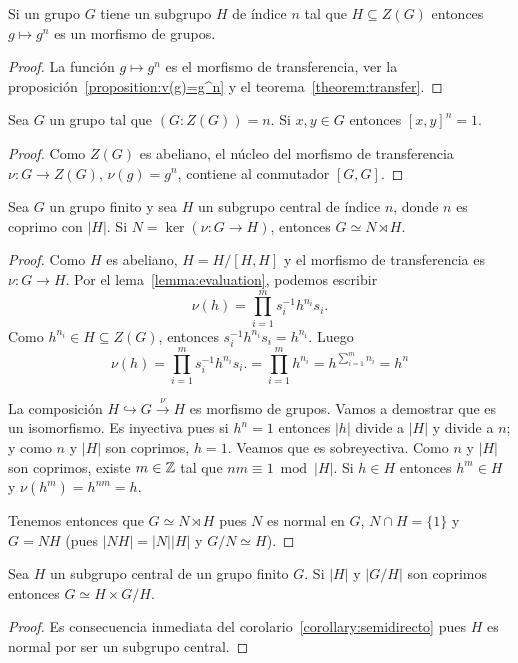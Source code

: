 \begin{corollary}
	Si un grupo $G$ tiene un subgrupo $H$ de índice $n$ tal que $H\subseteq
	Z(G)$ entonces $g\mapsto g^n$ es un morfismo de grupos.
\end{corollary}

\begin{proof}
	La función $g\mapsto g^n$ es el morfismo de transferencia, ver la
	proposición~\ref{proposition:v(g)=g^n} y el teorema~\ref{theorem:transfer}.
\end{proof}

\begin{corollary}
	\label{corollary:[x,y]^n=1}
	Sea $G$ un grupo tal que $(G:Z(G))=n$. Si $x,y\in G$ entonces $[x,y]^n=1$. 
\end{corollary}

\begin{proof}
	Como $Z(G)$ es abeliano, el núcleo del morfismo de transferencia $\nu\colon
	G\to Z(G)$, $\nu(g)=g^n$, contiene al conmutador $[G,G]$.
\end{proof}

\begin{corollary}
	\label{corollary:semidirecto}
	Sea $G$ un grupo finito y sea $H$ un subgrupo central de
 	índice $n$, donde $n$ es coprimo con $|H|$. 
    Si $N=\ker(\nu\colon G\to H)$, entonces $G\simeq N\rtimes H$.
\end{corollary}

\begin{proof}
	Como $H$ es abeliano, $H=H/[H,H]$ y el morfismo de transferencia es
	$\nu\colon G\to H$. Por el lema~\ref{lemma:evaluation}, podemos escribir
	\[
		\nu(h)
		=\prod_{i=1}^m s_i^{-1}h^{n_i}s_i.
	\]
	Como $h^{n_i}\in H\subseteq Z(G)$, entonces $s_i^{-1}h^{n_i}s_i=h^{n_i}$. 
	Luego  
	\[
	\nu(h)
	=\prod_{i=1}^m s_i^{-1}h^{n_i}s_i.
    =\prod_{i=1}^m h^{n_i}
	=h^{\sum_{i=1}^m n_i}=h^n
	\]
	
	La composición $H\hookrightarrow G\xrightarrow{\nu} H$ es morfismo de
	grupos. Vamos a demostrar que es un isomorfismo. Es inyectiva pues si $h^n=1$
	entonces $|h|$ divide a $|H|$ y divide a $n$; y como $n$ y $|H|$ son
	coprimos, $h=1$. Veamos que es sobreyectiva. Como $n$ y $|H|$ son coprimos,
	existe $m\in\mathbb{Z}$ tal que $nm\equiv 1\bmod |H|$. Si $h\in H$ entonces $h^m\in
	H$ y $\nu(h^m)=h^{nm}=h$. 

	Tenemos entonces que $G\simeq N\rtimes H$ pues $N$ es normal en $G$, $N\cap
	H=\{1\}$ y $G=NH$ (pues $|NH|=|N||H|$ y $G/N\simeq H$).
\end{proof}

\begin{corollary}[Frobenius]
	Sea $H$ un subgrupo central de un grupo finito $G$. Si $|H|$
	y $|G/H|$ son coprimos entonces $G\simeq H\times G/H$.
\end{corollary}

\begin{proof}
	Es consecuencia inmediata del corolario~\ref{corollary:semidirecto} pues
	$H$ es normal por ser un subgrupo central.
\end{proof}

